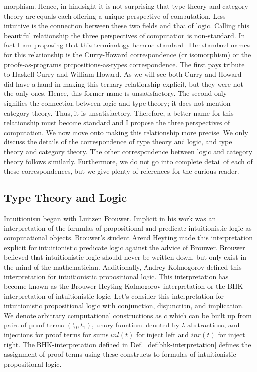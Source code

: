 morphism.  Hence, in hindsight it is not surprising that type theory
and category theory are equals each offering a unique perspective of
computation.  Less intuitive is the connection between these two
fields and that of logic.  Calling this beautiful relationship the
three perspectives of computation is non-standard.  In fact I am
proposing that this terminology become standard.  The standard names
for this relationship is the Curry-Howard correspondence (or
isomorphism) or the proofs-as-programs propositions-as-types
correspondence.  The first pays tribute to Haskell Curry and William
Howard. As we will see both Curry and Howard did have a hand in making
this ternary relationship explicit, but they were not the only ones.
Hence, this former name is unsatisfactory. The second only signifies
the connection between logic and type theory; it does not mention
category theory.  Thus, it is unsatisfactory.  Therefore, a better
name for this relationship must become standard and I propose the
three perspectives of computation.  We now move onto making this
relationship more precise.  We only discuss the details of the
correspondence of type theory and logic, and type theory and category
theory.  The other correspondence between logic and category theory
follows similarly. Furthermore, we do not go into complete detail of
each of these correspondences, but we give plenty of references for
the curious reader.

\subsection{Type Theory and Logic}
\label{subsec:type_theory_logic}
Intuitionism began with Luitzen Brouwer.  Implicit in his work was an
interpretation of the formulas of propositional and predicate
intuitionistic logic as computational objects.  Brouwer's student
Arend Heyting made this interpretation explicit for intuitionistic
predicate logic against the advice of Brouwer.  Brouwer believed that
intuitionistic logic should never be written down, but only exist in
the mind of the mathematician.  Additionally, Andrey Kolmogorov
defined this interpretation for intuitionistic propositional logic.
This interpretation has become known as the
Brouwer-Heyting-Kolmogorov-interpretation or the BHK-interpretation of
intuitionistic logic.  Let's consider this interpretation for
intuitionistic propositional logic with conjunction, disjunction, and
implication.  We denote arbitrary computational constructions as $c$
which can be built up from pairs of proof terms $(t_0,t_1)$, unary
functions denoted by $\lambda$-abstractions, and injections for proof
terms for sums $inl(t)$ for inject left and $inr(t)$ for inject right.
The BHK-interpretation defined in Def.~\ref{def:bhk-interpretation}
defines the assignment of proof terms using these constructs to
formulas of intuitionistic propositional logic.

